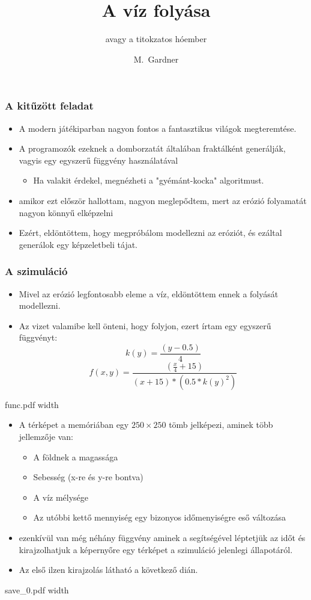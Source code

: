\documentclass{beamer}
\title[A víz folyása]{A víz folyása}
\subtitle{avagy a titokzatos hóember}
\author[Gardner]{M.~Gardner}
\begin{document}
	\frame{\titlepage}
	\begin{frame}
		\frametitle{A kitűzött feladat}
		\begin{itemize}
			\item A modern játékiparban nagyon fontos a fantasztikus világok megteremtése.
			\pause
			\item A programozók ezeknek a domborzatát általában fraktálként generálják, vagyis egy egyszerű függvény használatával
			\pause
			\begin{itemize}
				\item Ha valakit érdekel, megnézheti a "gyémánt-kocka" algoritmust.
			\end{itemize}
			\pause
			\item amikor ezt először hallottam, nagyon meglepődtem, mert az erózió folyamatát nagyon könnyű elképzelni
			\pause
			\item Ezért, eldöntöttem, hogy megpróbálom modellezni az eróziót, és ezáltal generálok egy képzeletbeli tájat.
		\end{itemize}
	\end{frame}
	\begin{frame}
		\frametitle{A szimuláció}
		\begin{itemize}
			\item Mivel az erózió legfontosabb eleme a víz, eldöntöttem ennek a folyását modellezni.
			\pause
			\item Az vizet valamibe kell önteni, hogy folyjon, ezert írtam egy egyszerű függvényt:
			\begin{equation}
				k(y)=\frac{(y-0.5)}{4}
			\end{equation}
			\begin{equation}
				f(x,y)=\frac{(\frac{x}{4}+15)}{(x+15)*(0.5*k(y)^{2})}
			\end{equation}
		\end{itemize}
\end{frame}
	\begin{frame}
		\XeTeXpdffile func.pdf width \textwidth
	\end{frame}
	\begin{frame}
		\begin{itemize}
			\item A térképet a memóriában egy $250 \times 250$ tömb jelképezi, aminek több jellemzője van:

			\pause
			\begin{itemize}
				\item A földnek a magassága
			\pause
				\item Sebesség (x-re és y-re bontva)
			\pause
				\item A víz mélysége
			\pause
				\item Az utóbbi kettő mennyiség egy bizonyos időmenyiségre eső változása
			\pause
			\end{itemize}
			\item ezenkívül van még néhány függvény aminek a segítségével léptetjük az időt és kirajzolhatjuk a képernyőre egy térképet a szimuláció jelenlegi állapotáról.
			\pause
			\item Az első ilzen kirajzolás látható a következő dián.
		\end{itemize}
	\end{frame}
	\begin{frame}
		\XeTeXpdffile save_0.pdf width \textwidth
	\end{frame}
\end{document}
